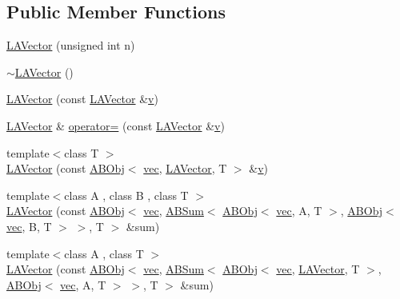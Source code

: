 \subsection*{Public Member Functions}
\begin{DoxyCompactItemize}
\item 
\mbox{\hyperlink{classROOT_1_1Minuit2_1_1LAVector_a3dca313e27f716415056d248bd05cf1f}{L\+A\+Vector}} (unsigned int n)
\item 
\mbox{\hyperlink{classROOT_1_1Minuit2_1_1LAVector_a72c44338e1a37837e9546bfd674c22cb}{$\sim$\+L\+A\+Vector}} ()
\item 
\mbox{\hyperlink{classROOT_1_1Minuit2_1_1LAVector_ad568d638899b4fc3631c3d0a1d76f1cd}{L\+A\+Vector}} (const \mbox{\hyperlink{classROOT_1_1Minuit2_1_1LAVector}{L\+A\+Vector}} \&\mbox{\hyperlink{adat__devel_2lib_2hadron_2hadron__timeslice_8cc_a716fc87f5e814be3ceee2405ed6ff22a}{v}})
\item 
\mbox{\hyperlink{classROOT_1_1Minuit2_1_1LAVector}{L\+A\+Vector}} \& \mbox{\hyperlink{classROOT_1_1Minuit2_1_1LAVector_ad38b5ed9fc32389cb68034cde125b203}{operator=}} (const \mbox{\hyperlink{classROOT_1_1Minuit2_1_1LAVector}{L\+A\+Vector}} \&\mbox{\hyperlink{adat__devel_2lib_2hadron_2hadron__timeslice_8cc_a716fc87f5e814be3ceee2405ed6ff22a}{v}})
\item 
{\footnotesize template$<$class T $>$ }\\\mbox{\hyperlink{classROOT_1_1Minuit2_1_1LAVector_ac38d854f7a156fc61cabce29416f36cc}{L\+A\+Vector}} (const \mbox{\hyperlink{classROOT_1_1Minuit2_1_1ABObj}{A\+B\+Obj}}$<$ \mbox{\hyperlink{classROOT_1_1Minuit2_1_1vec}{vec}}, \mbox{\hyperlink{classROOT_1_1Minuit2_1_1LAVector}{L\+A\+Vector}}, T $>$ \&\mbox{\hyperlink{adat__devel_2lib_2hadron_2hadron__timeslice_8cc_a716fc87f5e814be3ceee2405ed6ff22a}{v}})
\item 
{\footnotesize template$<$class A , class B , class T $>$ }\\\mbox{\hyperlink{classROOT_1_1Minuit2_1_1LAVector_a67f11f13d8b0880924b95b6e90c0005a}{L\+A\+Vector}} (const \mbox{\hyperlink{classROOT_1_1Minuit2_1_1ABObj}{A\+B\+Obj}}$<$ \mbox{\hyperlink{classROOT_1_1Minuit2_1_1vec}{vec}}, \mbox{\hyperlink{classROOT_1_1Minuit2_1_1ABSum}{A\+B\+Sum}}$<$ \mbox{\hyperlink{classROOT_1_1Minuit2_1_1ABObj}{A\+B\+Obj}}$<$ \mbox{\hyperlink{classROOT_1_1Minuit2_1_1vec}{vec}}, A, T $>$, \mbox{\hyperlink{classROOT_1_1Minuit2_1_1ABObj}{A\+B\+Obj}}$<$ \mbox{\hyperlink{classROOT_1_1Minuit2_1_1vec}{vec}}, B, T $>$ $>$, T $>$ \&sum)
\item 
{\footnotesize template$<$class A , class T $>$ }\\\mbox{\hyperlink{classROOT_1_1Minuit2_1_1LAVector_a954c19ce9b70651d06203ca76e59b0da}{L\+A\+Vector}} (const \mbox{\hyperlink{classROOT_1_1Minuit2_1_1ABObj}{A\+B\+Obj}}$<$ \mbox{\hyperlink{classROOT_1_1Minuit2_1_1vec}{vec}}, \mbox{\hyperlink{classROOT_1_1Minuit2_1_1ABSum}{A\+B\+Sum}}$<$ \mbox{\hyperlink{classROOT_1_1Minuit2_1_1ABObj}{A\+B\+Obj}}$<$ \mbox{\hyperlink{classROOT_1_1Minuit2_1_1vec}{vec}}, \mbox{\hyperlink{classROOT_1_1Minuit2_1_1LAVector}{L\+A\+Vector}}, T $>$, \mbox{\hyperlink{classROOT_1_1Minuit2_1_1ABObj}{A\+B\+Obj}}$<$ \mbox{\hyperlink{classROOT_1_1Minuit2_1_1vec}{vec}}, A, T $>$ $>$, T $>$ \&sum)

\end{DoxyCompactItemize}
